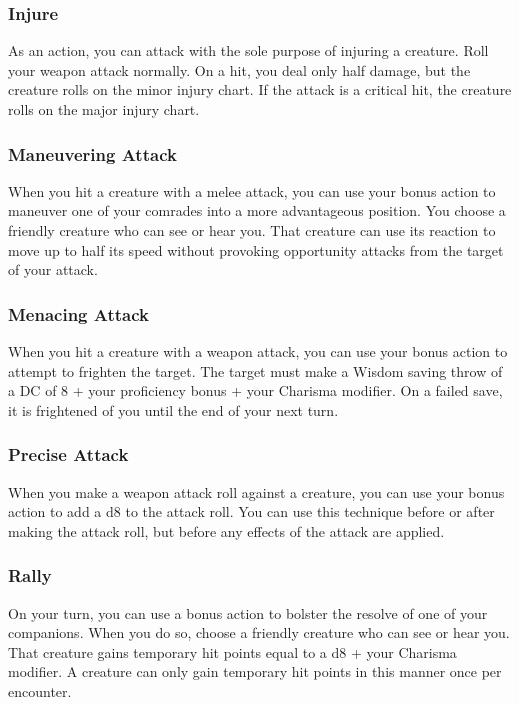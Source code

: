 \subsubsection{Injure} \label{tec::injure}
As an action, you can attack with the sole purpose of injuring a creature.
Roll your weapon attack normally.
On a hit, you deal only half damage, but the creature rolls on the minor injury chart.
If the attack is a critical hit, the creature rolls on the major injury chart.

\subsubsection{Maneuvering Attack} \label{tec::maneuveringattack}
When you hit a creature with a melee attack, you can use your bonus action to maneuver one of your comrades into a more advantageous position.
You choose a friendly creature who can see or hear you.
That creature can use its reaction to move up to half its speed without provoking opportunity attacks from the target of your attack.

\subsubsection{Menacing Attack} \label{tec::menacingattack}
When you hit a creature with a weapon attack, you can use your bonus action to attempt to frighten the target.
The target must make a Wisdom saving throw of a DC of 8 + your proficiency bonus + your Charisma modifier.
On a failed save, it is frightened of you until the end of your next turn.

\subsubsection{Precise Attack} \label{tec::preciseattack}
When you make a weapon attack roll against a creature, you can use your bonus action to add a d8 to the attack roll.
You can use this technique before or after making the attack roll, but before any effects of the attack are applied.

\subsubsection{Rally} \label{tec::rally}
On your turn, you can use a bonus action to bolster the resolve of one of your companions.
When you do so, choose a friendly creature who can see or hear you.
That creature gains temporary hit points equal to a d8 + your Charisma modifier.
A creature can only gain temporary hit points in this manner once per encounter.

